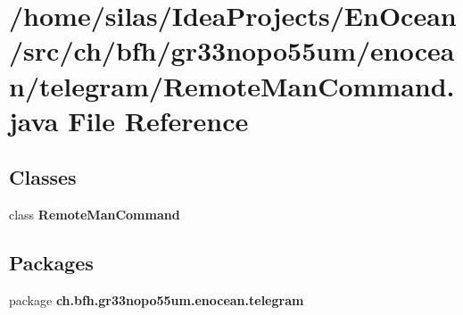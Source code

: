 \section{/home/silas/\+Idea\+Projects/\+En\+Ocean/src/ch/bfh/gr33nopo55um/enocean/telegram/\+Remote\+Man\+Command.java File Reference}
\label{RemoteManCommand_8java}
\subsection*{Classes}
\begin{DoxyCompactItemize}
\item 
class {\bf Remote\+Man\+Command}
\end{DoxyCompactItemize}
\subsection*{Packages}
\begin{DoxyCompactItemize}
\item 
package {\bf ch.\+bfh.\+gr33nopo55um.\+enocean.\+telegram}
\end{DoxyCompactItemize}

